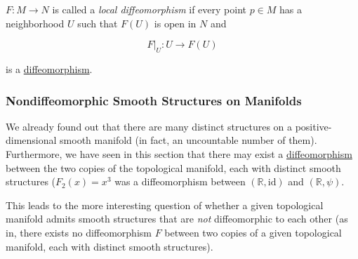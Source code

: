 \documentclass{article}
\newcounter{question}[section]
\newcounter{definition}[section]
\begin{document}
    \begin{definition}
      \label{def:local-diffeomorphism}
      $F: M \to N$ is called a \textit{local diffeomorphism} if every point $p \in M$ has a neighborhood $U$ such that $F(U)$ is open in $N$ and 

        \begin{equation}
          F \big|_U : U \to F(U)
        \end{equation}

      is a \hyperref[def:diffeomorphism-2]{diffeomorphism}. 
    \end{definition}

    \subsubsection{Nondiffeomorphic Smooth Structures on Manifolds}

      We already found out that there are many distinct structures on a positive-dimensional smooth manifold (in fact, an uncountable number of them). Furthermore, we have seen in this section that there may exist a \hyperref[def:diffeomorphism-2]{diffeomorphism} between the two copies of the topological manifold, each with distinct smooth structures ($F_2 (x) = x^3$ was a diffeomorphism between $(\mathbb{R}, \text{id})$ and $(\mathbb{R}, \psi)$. 

      This leads to the more interesting question of whether a given topological manifold admits smooth structures that are \textit{not} diffeomorphic to each other (as in, there exists no diffeomorphism $F$ between two copies of a given topological manifold, each with distinct smooth structures). 
\end{document}
